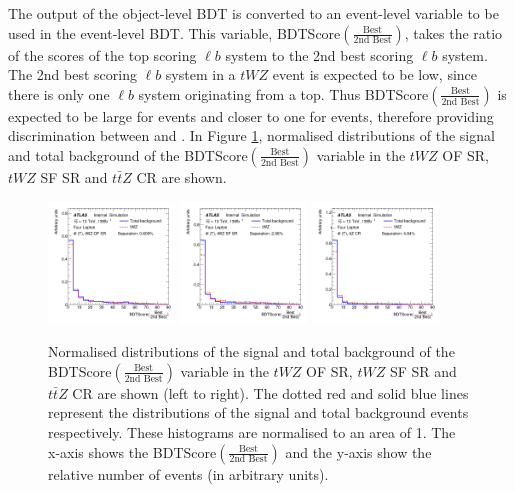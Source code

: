 The output of the object-level BDT is converted to an event-level variable to be used in the event-level BDT. This variable, BDTScore$(\frac{\text{Best}}{\text{2nd Best}})$, takes the ratio of the scores of the top scoring $\ell b$ system to the 2nd best scoring $\ell b$ system. The 2nd best scoring $\ell b$ system in a $tWZ$ event is expected to be low, since there is only one $\ell b$ system originating from a top. Thus BDTScore$(\frac{\text{Best}}{\text{2nd Best}})$ is expected to be large for \tWZ events and closer to one for \ttZ events, therefore providing discrimination between \tWZ and \ttZ. In Figure \ref{fig:bdtscore-bestover2ndbest}, normalised distributions of the signal and total background of the BDTScore$(\frac{\text{Best}}{\text{2nd Best}})$ variable in the $tWZ$ OF SR, $tWZ$ SF SR and $t\bar{t}Z$ CR are shown.
\begin{figure}
    \centering
    \includegraphics[width=0.3\textwidth]{figures/bdtPlots/lep4_tWZ_4T_OF_BDT_Score_bestOver2ndBest_noExclusion.png}
    \includegraphics[width=0.3\textwidth]{figures/bdtPlots/lep4_tWZ_4T_SF_BDT_Score_bestOver2ndBest_noExclusion.png}
    \includegraphics[width=0.3\textwidth]{figures/bdtPlots/lep4_ttZ_4T_BDT_Score_bestOver2ndBest_noExclusion.png}
    \caption{Normalised distributions of the signal and total background of the BDTScore$(\frac{\text{Best}}{\text{2nd Best}})$ variable in the $tWZ$ OF SR, $tWZ$ SF SR and $t\bar{t}Z$ CR are shown (left to right). The dotted red and solid blue lines represent the distributions of the signal and total background events respectively. These histograms are normalised to an area of 1. The x-axis shows the BDTScore$(\frac{\text{Best}}{\text{2nd Best}})$ and the y-axis show the relative number of events (in arbitrary units).}
    \label{fig:bdtscore-bestover2ndbest}
\end{figure}

